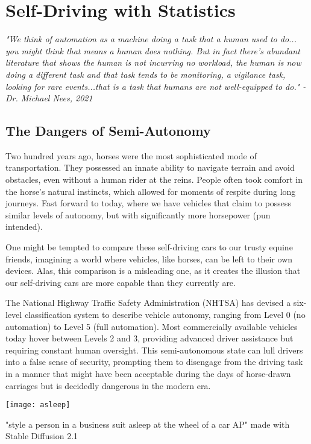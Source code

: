 \setchapterpreamble[u]{\margintoc}
\chapter{Self-Driving with Statistics}

\textit{"We think of automation as a machine doing a task that a human used to do... you might think that means a human does nothing. But in fact there's abundant literature that shows the human is not incurring no workload, the human is now doing a different task and that task tends to be monitoring, a vigilance task, looking for rare events...that is a task that humans are not well-equipped to do." - Dr. Michael Nees, 2021} \cite{nees2021}


\section{The Dangers of Semi-Autonomy}

Two hundred years ago, horses were the most sophisticated mode of transportation. They possessed an innate ability to navigate terrain and avoid obstacles, even without a human rider at the reins. People often took comfort in the horse's natural instincts, which allowed for moments of respite during long journeys. Fast forward to today, where we have vehicles that claim to possess similar levels of autonomy, but with significantly more horsepower (pun intended).

One might be tempted to compare these self-driving cars to our trusty equine friends, imagining a world where vehicles, like horses, can be left to their own devices. Alas, this comparison is a misleading one, as it creates the illusion that our self-driving cars are more capable than they currently are.

The National Highway Traffic Safety Administration (NHTSA) has devised a six-level classification system to describe vehicle autonomy, ranging from Level 0 (no automation) to Level 5 (full automation). Most commercially available vehicles today hover between Levels 2 and 3, providing advanced driver assistance but requiring constant human oversight. This semi-autonomous state can lull drivers into a false sense of security, prompting them to disengage from the driving task in a manner that might have been acceptable during the days of horse-drawn carriages but is decidedly dangerous in the modern era.

\begin{pdf}
\begin{marginfigure}[-5.5cm]
        \texttt{[image: asleep]}
        \caption{"style a person in a business suit asleep at the wheel of a car AP" made with Stable Diffusion 2.1}
\end{marginfigure}
\end{pdf}

